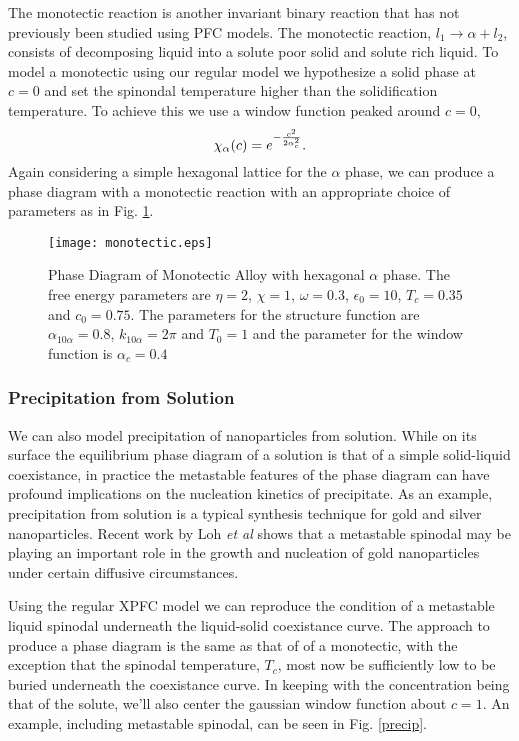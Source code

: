 The monotectic reaction is another invariant binary reaction that has not
previously been studied using PFC models. The monotectic reaction, $l_1
\rightarrow \alpha + l_2$, consists of decomposing liquid into a solute poor
solid and solute rich liquid. To model a monotectic using our regular model we
hypothesize a solid phase at $c=0$ and set the spinondal temperature higher
than the solidification temperature. To achieve this we use a window function
peaked around $c = 0$,
%
\begin{equation}
    \chi_\alpha(c) = e^{-\frac{c^2}{2\alpha_c^2}}.
\end{equation}
%
Again considering a simple hexagonal lattice for the $\alpha$ phase, we can
produce a phase diagram with a monotectic reaction with an appropriate choice
of parameters as in Fig. \ref{monotectic}.

\begin{figure}
    \centering
	\texttt{[image: monotectic.eps]}
	\caption{
        \label{monotectic} Phase Diagram of Monotectic Alloy with hexagonal
        $\alpha$ phase. The free energy parameters are $\eta = 2$, $\chi=1$,
        $\omega=0.3$, $\epsilon_0 = 10$, $T_c = 0.35$ and $c_0 = 0.75$. The
        parameters for the structure function are $\alpha_{10\alpha} = 0.8$,
        $k_{10\alpha} = 2\pi$ and $T_0 = 1$ and the parameter for the window
        function is $\alpha_c = 0.4$
    }
\end{figure}

\subsubsection{Precipitation from Solution} %

We can also model precipitation of nanoparticles from solution. While on its
surface the equilibrium phase diagram of a solution is that of a simple
solid-liquid coexistance, in practice the metastable features of the phase
diagram can have profound implications on the nucleation kinetics of
precipitate. As an example, precipitation from solution is a typical synthesis
technique for gold and silver nanoparticles. Recent work by Loh \textit{et al}
shows that a metastable spinodal may be playing an important role in the growth
and nucleation of gold nanoparticles under certain diffusive circumstances.

Using the regular XPFC model we can reproduce the condition of a metastable
liquid spinodal underneath the liquid-solid coexistance curve. The approach to
produce a phase diagram is the same as that of of a monotectic, with the
exception that the spinodal temperature, $T_c$, most now be sufficiently low to
be buried underneath the coexistance curve. In keeping with the concentration
being that of the solute, we'll also center the gaussian window function about
$c = 1$. An example, including metastable spinodal, can be seen in Fig.
\ref{precip}.


